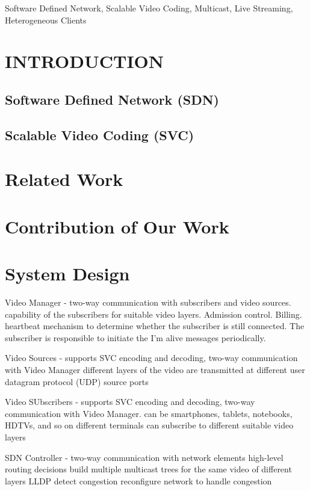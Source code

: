 \documentclass[a4paper, 10pt, conference]{ieeeconf}
\begin{document}
\begin{keywords}
Software Defined Network, Scalable Video Coding, Multicast, Live Streaming, Heterogeneous Clients
\end{keywords}


\section{INTRODUCTION}

\subsection{Software Defined Network (SDN)}

\subsection{Scalable Video Coding (SVC)}

\section{Related Work}

\section{Contribution of Our Work}

\section{System Design}
Video Manager - two-way communication with subscribers and video sources. capability of the subscribers for suitable video layers. Admission control. Billing. heartbeat mechanism to determine whether the subscriber is still connected. The subscriber is responsible to initiate the I'm alive messages periodically.

Video Sources - supports SVC encoding and
decoding, two-way communication with Video Manager
different layers of the video are transmitted
at different user datagram protocol (UDP)
source ports

Video SUbscribers - supports SVC encoding and
decoding, two-way communication with Video Manager. can be
smartphones, tablets, notebooks, HDTVs, and so on
different terminals
can subscribe to different suitable video layers

SDN Controller - two-way communication with network elements 
high-level routing decisions
build multiple
multicast trees for the same video of different
layers
LLDP
detect congestion
reconfigure network to handle congestion
\end{document}
